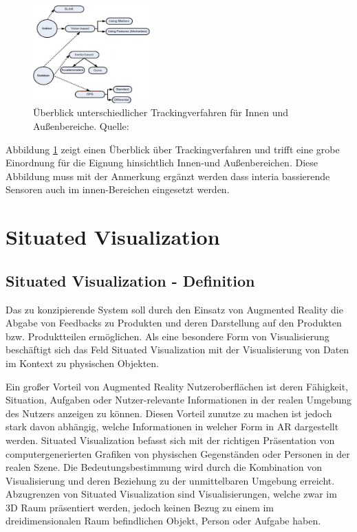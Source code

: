 \begin{figure}[H]
	\centering
	\includegraphics[width=0.4\textwidth]{resources/fundamentals/tracking_technicken.png}
	\caption{Überblick unterschiedlicher Trackingverfahren für Innen und Außenbereiche. Quelle: \cite{Arora2017}}
	\label{img:overviewTrackingMethods}
\end{figure}

Abbildung \ref{img:overviewTrackingMethods} zeigt einen Überblick über Trackingverfahren und trifft eine grobe Einordnung für die Eignung hinsichtlich Innen-und Außenbereichen.
Diese Abbildung muss mit der Anmerkung ergänzt werden dass interia bassierende Sensoren auch im innen-Bereichen eingesetzt werden. 

\section{Situated Visualization}
\subsection{Situated Visualization - Definition}


Das zu konzipierende System soll durch den Einsatz von Augmented Reality die Abgabe von Feedbacks zu Produkten und deren Darstellung auf den Produkten bzw. Produktteilen ermöglichen. 
Als eine besondere Form von Visualisierung beschäftigt sich das Feld Situated Visualization mit der Visualisierung von Daten im Kontext zu physischen Objekten. 

\cite[S.~239]{DieterSchmalstieg2016} Ein großer Vorteil von Augmented Reality Nutzeroberflächen ist deren Fähigkeit, Situation, Aufgaben oder Nutzer-relevante Informationen in 
der realen Umgebung des Nutzers anzeigen zu können. Diesen Vorteil zunutze zu machen ist jedoch stark davon abhängig, welche Informationen in welcher Form in AR dargestellt werden.
Situated Visualization befasst sich mit der richtigen Präsentation von computergenerierten
Grafiken von physischen Gegenständen oder Personen in der realen Szene. Die Bedeutungsbestimmung wird durch die Kombination von Visualisierung und deren 
Beziehung zu der unmittelbaren Umgebung erreicht. \cite[S.~188]{Marriott2018} Abzugrenzen von Situated Visualization sind Visualisierungen, welche zwar im 3D Raum präsentiert werden, jedoch keinen Bezug zu einem im dreidimensionalen Raum befindlichen Objekt, Person oder Aufgabe haben. \cite[S.~240]{DieterSchmalstieg2016} 

